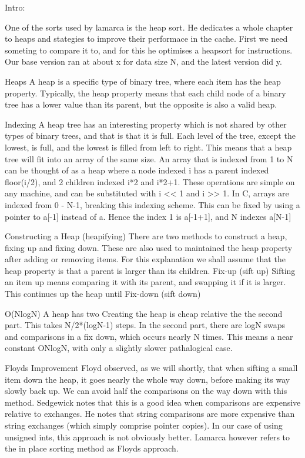Intro:

One of the sorts used by lamarca is the heap sort. He dedicates a whole chapter
to heaps and stategies to improve their performace in the cache. First we need
someting to compare it to, and for this he optimises a heapsort for
instructions. Our base version ran at about x for data size N, and the latest
version did y.

Heaps
A heap is a specific type of binary tree, where each item has the heap property.
Typically, the heap property means that each child node of a binary tree has a
lower value than its parent, but the opposite is also a valid heap.

Indexing
A heap tree has an interesting property which is not shared by other types of
binary trees, and that is that it is full. Each level of the tree, except the
lowest, is full, and the lowest is filled from left to right. This means that a
heap tree will fit into an array of the same size.
An array that is indexed from 1 to N can be thought of as a heap where a node
indexed i has a parent indexed floor(i/2), and 2 children indexed i*2 and
i*2+1.  These operations are simple on any machine, and can be substituted with
i << 1 and i >> 1.
In C, arrays are indexed from 0 - N-1, breaking this indexing scheme. This can
be fixed by using a pointer to a[-1] instead of a. Hence the index 1 is a[-1+1],
and N indexes a[N-1]

Constructing a Heap (heapifying)
There are two methods to construct a heap, fixing up and fixing down. These are
also used to maintained the heap property after adding or removing items. For
this explanation we shall assume that the heap property is that a parent is
larger than its children.
Fix-up (sift up)
Sifting an item up means comparing it with its parent, and swapping it if it is
larger. This continues up the heap until 
Fix-down (sift down)

O(NlogN)
A heap has two 
Creating the heap is cheap relative the the second part. This takes N/2*(logN-1)
steps. In the second part, there are logN swaps and comparisons in a fix down,
which occurs nearly N times.  This means a near constant ONlogN, with only a
slightly slower pathalogical case.

Floyds Improvement
Floyd observed, as we will shortly, that when sifting a small item down the
heap, it goes nearly the whole way down, before making its way slowly back up.
We can avoid half the comparisons on the way down with this method. Sedgewick
notes that this is a good idea when comparisons are expensive relative to
exchanges. He notes that string comparisons are more expensive than string
exchanges (which simply comprise pointer copies). In our case of using unsigned
ints, this approach is not obviously better.
Lamarca however refers to the in place sorting method as Floyds approach.


